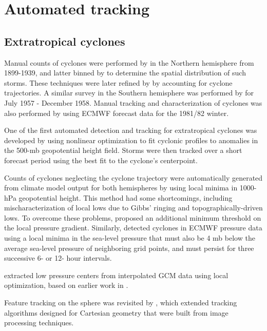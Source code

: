 \documentclass[gmdd, hvmath, online]{copernicus_discussions}
\begin{document}
\section{Automated tracking}

\subsection{Extratropical cyclones}

Manual counts of cyclones were performed by \cite{petterssen1956weather} in the Northern hemisphere from 1899-1939, and latter binned by \cite{klein1957principle} to determine the spatial distribution of such storms.  These techniques were later refined by \cite{whittaker1982atlas} by accounting for cyclone trajectories.  A similar survey in the Southern hemisphere was performed by \cite{taljaard1967development} for July 1957 - December 1958.  Manual tracking and characterization of cyclones was also performed by \cite{akyildiz1985systematic} using ECMWF forecast data for the 1981/82 winter.

One of the first automated detection and tracking for extratropical cyclones was developed by \cite{williamson1981storm} using nonlinear optimization to fit cyclonic profiles to anomalies in the 500-mb geopotential height field.  Storms were then tracked over a short forecast period using the best fit to the cyclone's centerpoint.

Counts of cyclones neglecting the cyclone trajectory were automatically generated from climate model output for both hemispheres by \cite{lambert1988cyclone} using local minima in 1000-hPa geopotential height.  This method had some shortcomings, including mischaracterization of local lows due to Gibbs' ringing and topographically-driven lows.  To overcome these problems, \cite{alpert1990climatological} proposed an additional minimum threshold on the local pressure gradient.  Similarly, \cite{le1990comparison} detected cyclones in ECMWF pressure data using a local minima in the sea-level pressure that must also be 4 mb below the average sea-level pressure of neighboring grid points, and must persist for three successive 6- or 12- hour intervals.

\cite{murray1991numerical} extracted low pressure centers from interpolated GCM data using local optimization, based on earlier work in \cite{rice1982durivation}.

Feature tracking on the sphere was revisited by \cite{hodges1995feature}, which extended tracking algorithms designed for Cartesian geometry \cite{hodges1994general} that were built from image processing techniques.
\end{document}

